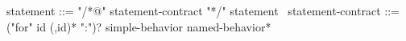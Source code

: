 \begin{syntax}
  statement ::= "/*@" statement-contract "*/" statement
  \
  statement-contract ::= ("for" id (,id)* ":")? simple-behavior named-behavior*  
\end{syntax}
